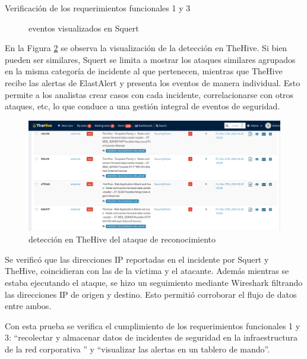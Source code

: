 \begin{section}{Verificación de los requerimientos funcionales 1 y 3}
\begin{figure}[H]
        \caption{eventos visualizados en Squert}
        \label{fig:squert-nmap}
    \end{figure}
    \FloatBarrier
    En la Figura \ref{fig:thehive-nmap} se observa la visualización de la detección en TheHive. Si bien pueden ser similares, Squert se limita a mostrar los ataques similares agrupados en la misma categoría de incidente al que pertenecen, mientras que TheHive recibe las alertas de ElastAlert y presenta los eventos de manera individual. Esto permite a los analistas crear casos con cada incidente, correlacionarse con otros ataques, etc, lo que conduce a una gestión integral de eventos de seguridad.
    \begin{figure}[H]
        \centering
        \includegraphics[width=1\textwidth]{./iteracion_1_imagenes/TheHive-NMAP.png}
        \caption{detección en TheHive del ataque de reconocimiento}
        \label{fig:thehive-nmap}
    \end{figure}
    \FloatBarrier
    Se verificó que las direcciones IP reportadas en el incidente por Squert y TheHive, coincidieran con las de la víctima y el atacante. Además mientras se estaba ejecutando el ataque, se hizo un seguimiento mediante Wireshark \cite{wireshark} filtrando las direcciones IP de origen y destino. Esto permitió corroborar el flujo de datos entre ambos.\par
    Con esta prueba se verifica el cumplimiento de los requerimientos funcionales 1 y 3: “recolectar y almacenar datos de incidentes de seguridad en la infraestructura de la red corporativa ” y “visualizar las alertas en un tablero de mando”.
    \end{section}